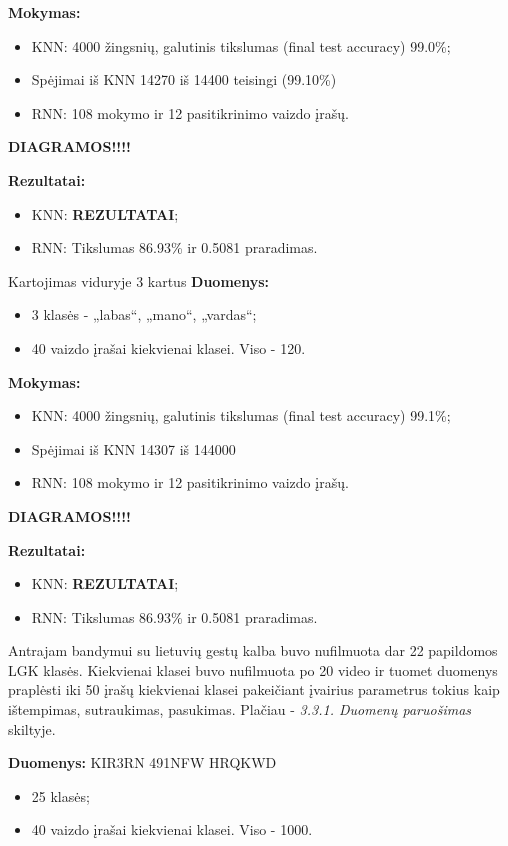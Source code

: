 \documentclass{VUMIFPSbakalaurinis}
\begin{document}
\textbf{Mokymas:}
\begin{itemize}
	\item KNN: 4000 žingsnių, galutinis tikslumas (final test accuracy) 99.0\%;
	\item Spėjimai iš KNN 14270 iš 14400 teisingi (99.10\%)
	\item RNN: 108 mokymo ir 12 pasitikrinimo vaizdo įrašų.
\end{itemize}

\textbf{DIAGRAMOS!!!!}

\textbf{Rezultatai:}
\begin{itemize}
	\item KNN: \textbf{REZULTATAI};
	\item RNN: Tikslumas 86.93\% ir 0.5081 praradimas.
\end{itemize}


Kartojimas viduryje 3 kartus
\textbf{Duomenys:}
\begin{itemize}
	\item 3 klasės - „labas“, „mano“, „vardas“;
	\item 40 vaizdo įrašai kiekvienai klasei. Viso - 120.
\end{itemize}

\textbf{Mokymas:}
\begin{itemize}
	\item KNN: 4000 žingsnių, galutinis tikslumas (final test accuracy) 99.1\%;
	\item Spėjimai iš KNN 14307 iš 144000
	\item RNN: 108 mokymo ir 12 pasitikrinimo vaizdo įrašų.
\end{itemize}

\textbf{DIAGRAMOS!!!!}

\textbf{Rezultatai:}
\begin{itemize}
	\item KNN: \textbf{REZULTATAI};
	\item RNN: Tikslumas 86.93\% ir 0.5081 praradimas.
\end{itemize}

Antrajam bandymui su lietuvių gestų kalba buvo nufilmuota dar 22 papildomos LGK klasės. Kiekvienai klasei buvo nufilmuota po 20 video ir tuomet duomenys praplėsti iki 50 įrašų kiekvienai klasei pakeičiant įvairius parametrus tokius kaip ištempimas, sutraukimas, pasukimas. Plačiau - \textit{3.3.1. Duomenų paruošimas} skiltyje.

\textbf{Duomenys:}
KIR3RN
491NFW
HRQKWD
\begin{itemize}
	\item 25 klasės;
	\item 40 vaizdo įrašai kiekvienai klasei. Viso - 1000.
\end{itemize}
\end{document}
